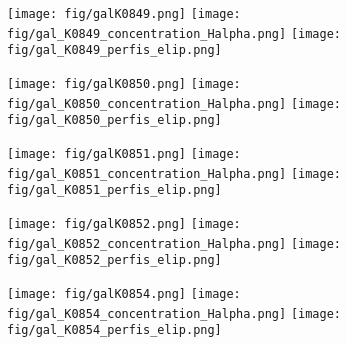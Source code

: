 \begin{figure}[!ht]
\begin{center}
\setcaptionmargin{1cm}
\texttt{[image: fig/galK0849.png]}
\texttt{[image: fig/gal\_K0849\_concentration\_Halpha.png]}
\texttt{[image: fig/gal\_K0849\_perfis\_elip.png]}
\end{center}
\end{figure}


\begin{figure}[!ht]
\begin{center}
\setcaptionmargin{1cm}
\texttt{[image: fig/galK0850.png]}
\texttt{[image: fig/gal\_K0850\_concentration\_Halpha.png]}
\texttt{[image: fig/gal\_K0850\_perfis\_elip.png]}
\end{center}
\end{figure}


\begin{figure}[!ht]
\begin{center}
\setcaptionmargin{1cm}
\texttt{[image: fig/galK0851.png]}
\texttt{[image: fig/gal\_K0851\_concentration\_Halpha.png]}
\texttt{[image: fig/gal\_K0851\_perfis\_elip.png]}
\end{center}
\end{figure}


\begin{figure}[!ht]
\begin{center}
\setcaptionmargin{1cm}
\texttt{[image: fig/galK0852.png]}
\texttt{[image: fig/gal\_K0852\_concentration\_Halpha.png]}
\texttt{[image: fig/gal\_K0852\_perfis\_elip.png]}
\end{center}
\end{figure}


\begin{figure}[!ht]
\begin{center}
\setcaptionmargin{1cm}
\texttt{[image: fig/galK0854.png]}
\texttt{[image: fig/gal\_K0854\_concentration\_Halpha.png]}
\texttt{[image: fig/gal\_K0854\_perfis\_elip.png]}
\end{center}
\end{figure}


